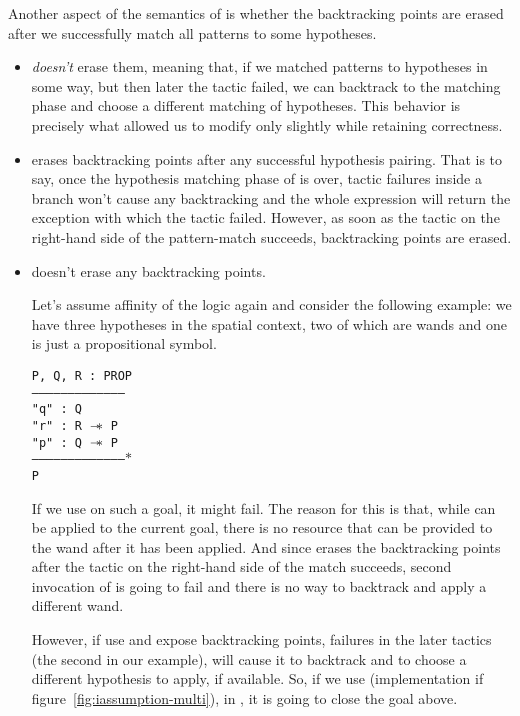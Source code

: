 Another aspect of the semantics of  is whether the backtracking points are erased after we successfully match all patterns to some hypotheses.
\begin{itemize}
\item {} \emph{doesn't} erase them, meaning that, if we matched patterns to hypotheses in some way, but then later the tactic failed, we can backtrack to the matching phase and choose a different matching of hypotheses.
This behavior is precisely what allowed us to modify  only slightly while retaining correctness.
\item {} erases backtracking points after any successful hypothesis pairing.
 That is to say, once the hypothesis matching phase of  is over, tactic failures inside a branch won't cause any backtracking and the whole expression will return the exception with which the tactic failed.
  However, as soon as the tactic on the right-hand side of the pattern-match succeeds, backtracking points are erased.
\item {} doesn't erase any backtracking points.

  Let's assume affinity of the logic again and consider the following example:
  we have three hypotheses in the spatial context, two of which are wands and one is just a propositional symbol.

\begin{minipage}{1.0\linewidth}
\texttt{P, Q, R : PROP\\
---------------------------------------\\
"q" : Q\\
"r" : R $\mathrel{-\mkern-6mu*}$ P\\
"p" : Q $\mathrel{-\mkern-6mu*}$ P\\
--------------------------------------$\ast$\\
P}
\end{minipage}

If we use  on such a goal, it might fail.
The reason for this is that, while  can be applied to the current goal, there is no resource that can be provided to the wand after it has been applied.
And since  erases the backtracking points after the tactic on the right-hand side of the match succeeds, second invocation of  is going to fail and there is no way to backtrack and apply a different wand.

However, if use  and expose backtracking points, failures in the later tactics (the second  in our example), will cause it to backtrack and to choose a different hypothesis to apply, if available.
So, if we use  (implementation if figure~\ref{fig:iassumption-multi}), in , it is going to close the goal above.


\end{itemize}
